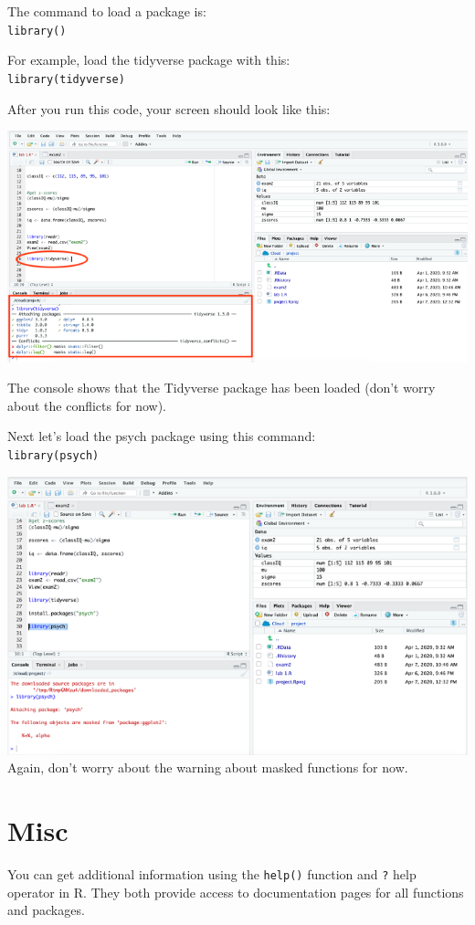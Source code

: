 \documentclass[
]{book}
\begin{document}
The command to load a package is:\\
\texttt{library()}

For example, load the tidyverse package with this:\\
\texttt{library(tidyverse)}

After you run this code, your screen should look like this:

\includegraphics{img/loadtidy.png}

The console shows that the Tidyverse package has been loaded (don't worry about the conflicts for now).

Next let's load the psych package using this command:\\
\texttt{library(psych)}

\includegraphics{img/loadpsyc.png}
Again, don't worry about the warning about masked functions for now.

\hypertarget{misc}{%
\section{Misc}\label{misc}}

You can get additional information using the \texttt{help()} function and \texttt{?} help operator in R. They both provide access to documentation pages for all functions and packages.
\end{document}
